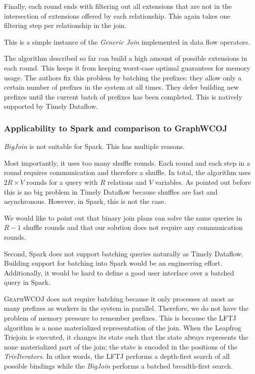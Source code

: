 Finally, each round ends with filtering out all extensions that are not in the intersection of extensions offered by each relationship.
This again takes one filtering step per relationship in the join.

This is a simple instance of the \textit{Generic Join} implemented in data flow operators.

The algorithm described so far can build a high amount of possible extensions in each round.
This keeps it from keeping worst-case optimal guarantees for memory usage.
The authors fix this problem by batching the prefixes:
they allow only a certain number of prefixes in the system at all times.
They defer building new prefixes until the current batch of prefixes has been completed.
This is natively supported by Timely Dataflow.

\subsubsection{Applicability to Spark and comparison to GraphWCOJ}
\textit{BigJoin} is not suitable for Spark.
This has multiple reasons.

Most importantly, it uses too many shuffle rounds.
Each round and each step in a round requires communication and therefore a shuffle.
In total, the algorithm uses $2R \times V$ rounds for a query with $R$ relations and $V$ variables.
As pointed out before this is no big problem in Timely Dataflow because shuffles are fast and asynchronous.
However, in Spark, this is not the case.

We would like to point out that binary join plans can solve the same queries in $R - 1$ shuffle rounds and
that our solution does not require any communication rounds.

Second, Spark does not support batching queries naturally as Timely Dataflow.
Building support for batching into Spark would be an engineering effort.
Additionally, it would be hard to define a good user interface over a batched query in Spark.

\textsc{GraphWCOJ} does not require batching because it only processes at most as many prefixes as workers in the system in parallel.
Therefore, we do not have the problem of memory pressure to remember prefixes.
This is because the \textsc{LFTJ} algorithm is a none materialized representation of the join.
When the Leapfrog Triejoin is executed, it changes its state such that the state always represents the none materialized
part of the join;
the state is encoded in the positions of the \textit{TrieIterators}.
In other words, the \textsc{LFTJ} performs a depth-first search of all possible bindings while the \textit{BigJoin}
performs a batched breadth-first search.

